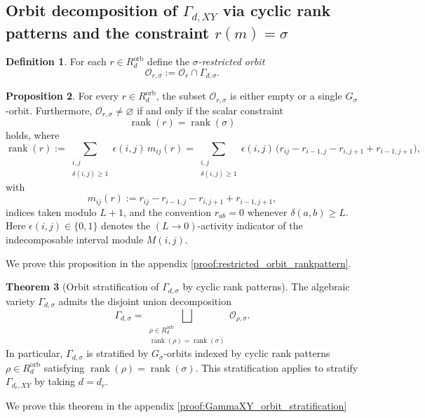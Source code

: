 \documentclass{article}
\theoremstyle{definition}
\newtheorem{theorem}{Theorem}[section]
\newtheorem{proposition}[theorem]{Proposition}
\newtheorem{definition}[theorem]{Definition}
\begin{document}
\subsection{Orbit decomposition of $\Gamma_{d,XY}$ via cyclic rank patterns and the constraint $r(m)=\sigma$}
\begin{definition}
For each \(r\in R_d^{\mathrm{orb}}\) define the \emph{\(\sigma\)-restricted orbit}
\[
\mathcal O_{r,\sigma}:=\mathcal O_r\cap \Gamma_{d,\sigma}.
\]
\end{definition}
\begin{proposition}\label{prop:restricted_orbit_rankpattern}
For every \(r\in R_d^{\mathrm{orb}}\), the subset \(\mathcal O_{r,\sigma}\) is either empty or a single
\(G_\sigma\)-orbit. Furthermore, \(\mathcal O_{r,\sigma}\neq\varnothing\) if and only if the scalar constraint
\[
\operatorname{rank}(r)=\operatorname{rank}(\sigma)
\]
holds, where
\begin{equation}\label{eq:rank_of_rankpattern}
\operatorname{rank}(r)
:=
\sum_{\substack{i,j\\ \delta(i,j)\ge 1}} \epsilon(i,j)\,m_{ij}(r)
=
\sum_{\substack{i,j\\ \delta(i,j)\ge 1}}
\epsilon(i,j)\,\bigl(r_{ij}-r_{i-1,j}-r_{i,j+1}+r_{i-1,j+1}\bigr),
\end{equation}
with
\[
m_{ij}(r):=r_{ij}-r_{i-1,j}-r_{i,j+1}+r_{i-1,j+1},
\]
indices taken modulo \(L+1\), and the convention \(r_{ab}=0\) whenever \(\delta(a,b) \ge L\).
Here \(\epsilon(i,j)\in\{0,1\}\) denotes the \((L\to 0)\)-activity indicator of the indecomposable
interval module \(M(i,j)\).
\end{proposition}
\noindent
We prove this proposition in the appendix \ref{proof:restricted_orbit_rankpattern}.
\begin{theorem}[Orbit stratification of \(\Gamma_{d,\sigma}\) by cyclic rank patterns]\label{prop:GammaXY_orbit_stratification}
The algebraic variety \(\Gamma_{d,\sigma}\) admits the disjoint union decomposition
\begin{equation}\label{eq:GammaXY_disjoint_union}
\Gamma_{d,\sigma}
=
\bigsqcup_{\substack{\rho\in R_d^{\mathrm{orb}}\\ \operatorname{rank}(\rho)=\operatorname{rank}(\sigma)}}
\mathcal O_{\rho,\sigma}.
\end{equation}
In particular, \(\Gamma_{d,\sigma}\) is stratified by \(G_\sigma\)-orbits indexed by cyclic rank patterns
\(\rho\in R_d^{\mathrm{orb}}\) satisfying \(\operatorname{rank}(\rho)=\operatorname{rank}(\sigma)\). This stratification applies to stratify $\Gamma_{d_r,XY}$ by taking $d=d_r$.
\end{theorem}
\noindent
We prove this theorem in the appendix \ref{proof:GammaXY_orbit_stratification}
\end{document}
